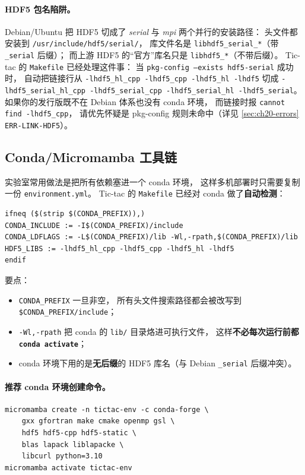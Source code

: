 \paragraph{HDF5 包名陷阱。}
Debian/Ubuntu 把 HDF5 切成了 \emph{serial} 与 \emph{mpi} 两个并行的安装路径：
头文件都安装到 \texttt{/usr/include/hdf5/serial/}，
库文件名是 \texttt{libhdf5\_serial\_*}（带 \texttt{\_serial} 后缀）；
而上游 HDF5 的“官方”库名只是 \texttt{libhdf5\_*}（不带后缀）。
Tic-tac 的 \texttt{Makefile} 已经处理这件事：
当 \texttt{pkg-config --exists hdf5-serial} 成功时，
自动把链接行从 \texttt{-lhdf5\_hl\_cpp -lhdf5\_cpp -lhdf5\_hl -lhdf5}
切成 \texttt{-lhdf5\_serial\_hl\_cpp -lhdf5\_serial\_cpp -lhdf5\_serial\_hl -lhdf5\_serial}。
如果你的发行版既不在 Debian 体系也没有 conda 环境，
而链接时报 \texttt{cannot find -lhdf5\_cpp}，
请优先怀疑是 pkg-config 规则未命中（详见 \cref{sec:ch20-errors} \texttt{ERR-LINK-HDF5}）。

\subsection{Conda/Micromamba 工具链}
\label{sec:ch20-env-conda}

实验室常用做法是把所有依赖塞进一个 conda 环境，
这样多机部署时只需要复制一份 \texttt{environment.yml}。
Tic-tac 的 \texttt{Makefile} 已经对 conda 做了\textbf{自动检测}：
\begin{lstlisting}[style=config,caption={Makefile 中的 conda 探针片段。}]
ifneq ($(strip $(CONDA_PREFIX)),)
CONDA_INCLUDE := -I$(CONDA_PREFIX)/include
CONDA_LDFLAGS := -L$(CONDA_PREFIX)/lib -Wl,-rpath,$(CONDA_PREFIX)/lib
HDF5_LIBS := -lhdf5_hl_cpp -lhdf5_cpp -lhdf5_hl -lhdf5
endif
\end{lstlisting}
要点：
\begin{itemize}
  \item \texttt{CONDA\_PREFIX} 一旦非空，
        所有头文件搜索路径都会被改写到 \texttt{\$CONDA\_PREFIX/include}；
  \item \texttt{-Wl,-rpath} 把 conda 的 \texttt{lib/} 目录烙进可执行文件，
        这样\textbf{不必每次运行前都 \texttt{conda activate}}；
  \item conda 环境下用的是\textbf{无后缀}的 HDF5 库名（与 Debian \texttt{\_serial} 后缀冲突）。
\end{itemize}

\paragraph{推荐 conda 环境创建命令。}
\begin{lstlisting}[style=config,caption={最小 conda 环境，足以让 \texttt{CPP/run} 与 Python workflow 全部跑通。}]
micromamba create -n tictac-env -c conda-forge \
    gxx gfortran make cmake openmp gsl \
    hdf5 hdf5-cpp hdf5-static \
    blas lapack liblapacke \
    libcurl python=3.10
micromamba activate tictac-env
\end{lstlisting}

